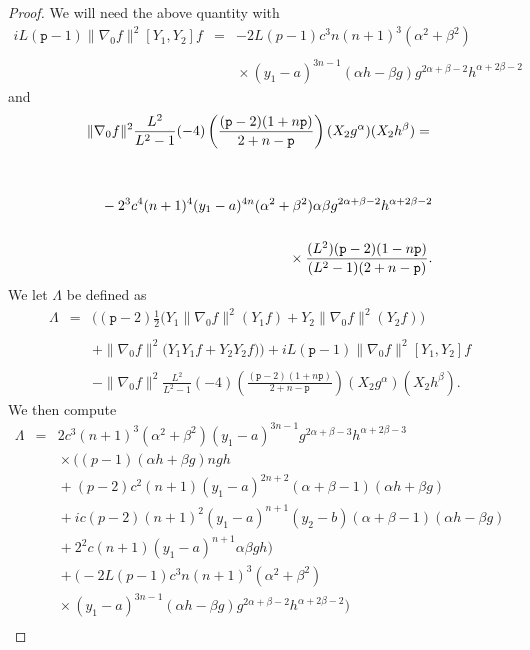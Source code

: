 \documentclass[12pt]{amsart}
\theoremstyle{plain}
\theoremstyle{definition}
\numberwithin{equation}{section}
\begin{document}
\begin{proof}
We will need the above quantity with
\begin{eqnarray*}
iL({\texttt{p}}-1) \|\nabla_0 f \|^{2}[Y_1,Y_2]f & = & -2L(p-1)c^3n(n+1)^3(\alpha^2+\beta^2) \\
&&\mbox{} \\
&&\mbox{}\times(y_1-a)^{3n-1}(\alpha h-\beta g)g^{2\alpha+\beta-2}h^{\alpha+2\beta-2}
\end{eqnarray*}
and
\begin{eqnarray*}
\lefteqn{\|\nabla_0 f \|^{2} \frac{L^2}{L^2-1}(-4)\left(\frac{({\texttt{p}}-2)(1+n{\texttt{p}})}{2+n-{\texttt{p}}}\right)(X_2g^{\alpha})(X_2h^{\beta}) = } && \\
\\
& & \mbox{} \\
& & \mbox{} -2^3c^4(n+1)^4(y_1-a)^{4n}(\alpha^2+\beta^2)\alpha \beta g^{2\alpha+\beta-2} h^{\alpha+2\beta-2}\\
& & \mbox{} \\
& & \mbox{}\times \frac{(L^2)({\texttt{p}}-2)(1-n{\texttt{p}})}{(L^2-1)(2+n-{\texttt{p}})}.
\end{eqnarray*}
We let $\Lambda$ be defined as
\begin{eqnarray*}
\Lambda & = & \Big(({\texttt{p}}-2)\frac{1}{2}\Big(Y_1\|\nabla_0f\|^2(Y_1f)+Y_2\|\nabla_0f\|^2(Y_2f)\Big) \\
& & \mbox{} \\
& & \mbox{}+\|\nabla_{0} f\|^{2}\big(Y_1Y_1f+Y_2Y_2f\big)\Big)+iL({\texttt{p}}-1) \|\nabla_0 f \|^{2}[Y_1,Y_2]f  \\
& & \mbox{} \\
& & \mbox{}-\|\nabla_0 f \|^{2} \frac{L^2}{L^2-1}(-4)\left(\frac{({\texttt{p}}-2)(1+n{\texttt{p}})}{2+n-{\texttt{p}}}\right)(X_2g^{\alpha})(X_2h^{\beta}).
\end{eqnarray*}
 We then compute
\begin{eqnarray*} 
 \Lambda & = & 2c^3(n+1)^3(\alpha ^2+\beta^2)(y_1-a)^{3n-1}g^{2\alpha+\beta-3}h^{\alpha+2\beta-3} \\
&& \mbox{}\times\Big((p-1)(\alpha h+ \beta g)ngh \\
&&\mbox{}+(p-2)c^2(n+1)(y_1-a)^{2n+2}(\alpha+\beta-1)(\alpha h+\beta g) \\
&&\mbox{}+ic(p-2)(n+1)^2(y_1-a)^{n+1}(y_2-b)(\alpha +\beta -1)(\alpha h -\beta g)\\
&&\mbox{}+2^2c(n+1)(y_1-a)^{n+1}\alpha \beta gh
\Big)\\
&& \mbox{}+\Big(-2L(p-1)c^3n(n+1)^3(\alpha^2+\beta^2) \\
&&\mbox{}\times(y_1-a)^{3n-1}(\alpha h-\beta g)g^{2\alpha+\beta-2}h^{\alpha+2\beta-2}\Big)\\

\end{eqnarray*}
\end{proof}
\end{document}
